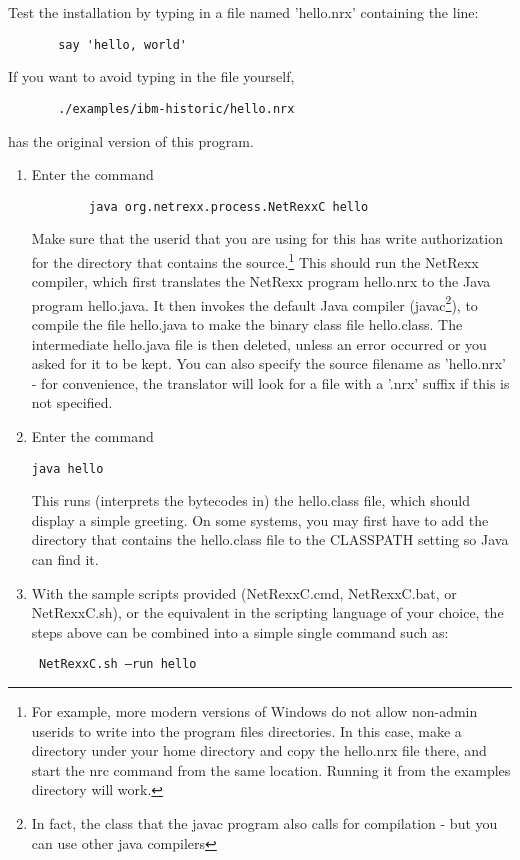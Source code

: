 Test the installation by typing in a file named 'hello.nrx' containing the line:
\begin{verbatim} 
       say 'hello, world' 
\end{verbatim}
 If you want to avoid typing in the file yourself,
\begin{verbatim} 
       ./examples/ibm-historic/hello.nrx
\end{verbatim}
has the original version of this program.
\begin{enumerate}
\item Enter the command
 \begin{verbatim}
        java org.netrexx.process.NetRexxC hello
\end{verbatim}
Make sure that the userid that you are using for this has write
authorization for the directory that contains the source.\footnote{For example,
more modern versions of Windows do not allow non-admin userids to
write into the program files directories. In this case, make a
directory under your home directory and copy the hello.nrx file there,
and start the nrc command from the same location. Running it from the
examples directory will work.}
This should run the NetRexx compiler, which first translates the
NetRexx program hello.nrx to the Java program hello.java. It then
invokes the default Java compiler (javac\footnote{In fact, the class
  that the javac program also calls for compilation - but you can use
  other java compilers}), to compile the file hello.java to make the
binary class file hello.class. The intermediate hello.java file is
then deleted, unless an error occurred or you asked for it to be
kept. You can also specify the source filename as 'hello.nrx' - for
convenience, the translator will look for a file with a '.nrx' suffix
if this is not specified.
\item Enter the command
 \begin{verbatim} 
java hello 
\end{verbatim}
This runs (interprets the bytecodes in) the hello.class file, which should display a simple greeting. On some systems, you may first have to add the directory that contains the hello.class file to the CLASSPATH setting so Java can find it. 
\item With the sample scripts provided (NetRexxC.cmd, NetRexxC.bat, or NetRexxC.sh), or the equivalent in the scripting language of your choice, the steps above can be combined into a simple single command such as:
  \begin{verbatim}
 NetRexxC.sh –run hello

\end{verbatim}
\end{enumerate}
